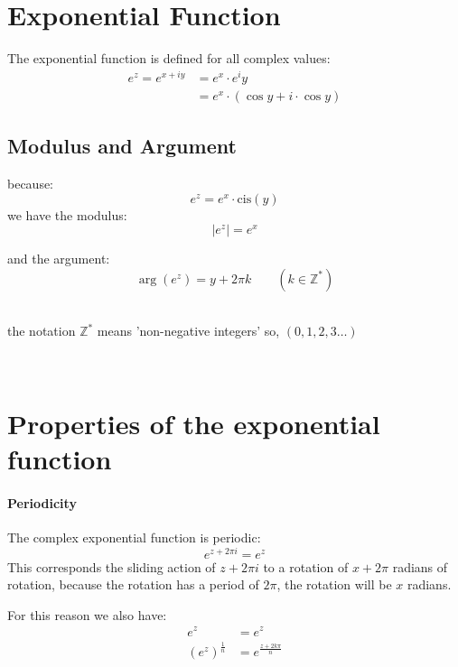 \documentclass[class=article, crop=false]{standalone}
\begin{document}
    \section{Exponential Function}
    The exponential function is defined for all complex values:
    \begin{align*}
      e^z =  e^{x +  iy} &= e^x \cdot e^iy \\
      &= e^x \cdot  \left(  \cos{y} +  i \cdot  \cos{y} \right)
    \end{align*}
    \subsection{Modulus and Argument}
    because:
    \[
    e^z = e^x\cdot \mathrm{cis}{\left( y \right) }
    \]
\noindent    we have the modulus:
    \[
            \left| e^z \right| = e^x
    \]

\noindent and the argument:
    \[
        \operatorname{arg}\left( e^z \right) = y + 2\pi k \qquad \left( k \in \mathbb{Z}^*  \right)
    \]\\

    \hfill\begin{minipage}{\dimexpr\textwidth-3cm}
      the notation $\mathbb{Z}^* $ means 'non-negative integers' so, $\left( 0, 1, 2, 3 \dots \right) $
    \end{minipage}
    \ \




    \section{Properties of the exponential function}
    \paragraph{Periodicity}
    The complex exponential function is periodic:
    \[
      e^{z +  2\pi i} =  e^z
    \]
    This corresponds the sliding action of $z +  2 \pi i$ to a rotation of $x +  2 \pi$ radians of rotation, because the rotation has a period of $2 \pi$, the rotation will be $x$ radians.

    For this reason we also have:
    \begin{align*}
    e^z &=  e^z\\
    \left( e^z \right)^{\frac{1}{n}}  &=  e^{\frac{z +  2 k \pi}{n}}
    \end{align*}
\end{document}
